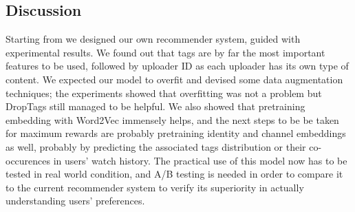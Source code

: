\subsection{Discussion}

Starting from \cite{youtuberec} we designed our own recommender system, guided with experimental results. We found out that tags are by far the most important features to be used, followed by uploader ID as each uploader has its own type of content. We expected our model to overfit and devised some data augmentation techniques; the experiments showed that overfitting was not a problem but DropTags still managed to be helpful. We also showed that pretraining embedding with Word2Vec immensely helps, and the next steps to be be taken for maximum rewards are probably pretraining identity and channel embeddings as well, probably by predicting the associated tags distribution or their co-occurences in users' watch history. The practical use of this model now has to be tested in real world condition, and A/B testing is needed in order to compare it to the current recommender system to verify its superiority in actually understanding users' preferences.
